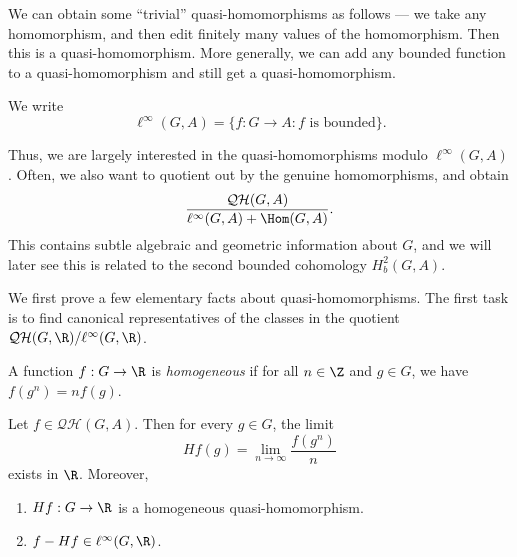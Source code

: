 \documentclass[a4paper]{article}
\newcommand\QH{\mathcal{QH}}
\begin{document}
We can obtain some ``trivial'' quasi-homomorphisms as follows --- we take any homomorphism, and then edit finitely many values of the homomorphism. Then this is a quasi-homomorphism. More generally, we can add any bounded function to a quasi-homomorphism and still get a quasi-homomorphism.

\begin{notation}
  We write
  \[
    \ell^\infty(G, A) = \{f: G \to A: \text{$f$ is bounded}\}.
  \]
\end{notation}

Thus, we are largely interested in the quasi-homomorphisms modulo $\ell^\infty(G, A)$. Often, we also want to quotient out by the genuine homomorphisms, and obtain
\[
  \frac{\QH(G, A)}{\ell^\infty(G, A) + \Hom(G, A)}.
\]
This contains subtle algebraic and geometric information about $G$, and we will later see this is related to the second bounded cohomology $H_b^2(G, A)$.

We first prove a few elementary facts about quasi-homomorphisms. The first task is to find canonical representatives of the classes in the quotient $\QH(G, \R)/\ell^\infty (G, \R)$.

\begin{defi}
  A function $f: G \to \R$ is \emph{homogeneous} if for all $n \in \Z$ and $g \in G$, we have $f(g^n) = n f(g)$.
\end{defi}

\begin{lemma}
  Let $f \in \QH(G, A)$. Then for every $g \in G$, the limit
  \[
    Hf(g) = \lim_{n \to \infty} \frac{f(g^n)}{n}
  \]
  exists in $\R$. Moreover,
  \begin{enumerate}
    \item $Hf: G \to \R$ is a homogeneous quasi-homomorphism.
    \item $f - Hf \in \ell^\infty(G, \R)$.
  \end{enumerate}
\end{lemma}
\end{document}
